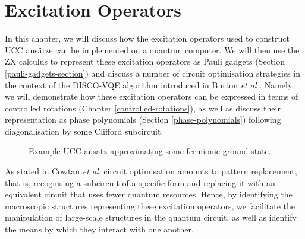 \chapter{Excitation Operators}%
\label{excitation-operators}

In this chapter, we will discuss how the excitation operators used to construct UCC ansätze can be implemented on a quantum computer. We will then use the ZX calculus to represent these excitation operators as Pauli gadgets (Section \ref{pauli-gadgets-section}) and discuss a number of circuit optimisation strategies in the context of the DISCO-VQE algorithm introduced in Burton \textit{et al} \cite{Burton2023}. Namely, we will demonstrate how these excitation operators can be expressed in terms of controlled rotations (Chapter \ref{controlled-rotations}), as well as discuss their representation as phase polynomials (Section \ref{phase-polynomials}) following diagonalisation by some Clifford subcircuit. 

\begin{figure}[H]
    \centering
    \caption{Example UCC ansatz approximating some fermionic ground state.}
\end{figure}

As stated in Cowtan \textit{et al}, circuit optimisation amounts to pattern replacement, that is, recognising a subcircuit of a specific form and replacing it with an equivalent circuit that uses fewer quantum resources. Hence, by identifying the macroscopic structures representing these excitation operators, we facilitate the manipulation of large-scale structures in the quantum circuit, as well as identify the means by which they interact with one another.
